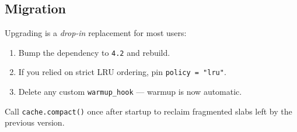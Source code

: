 \documentclass[
]{article}
\providecommand{\tightlist}{%
  \setlength{\itemsep}{0pt}\setlength{\parskip}{0pt}}
\begin{document}
\subsection{Migration}\label{migration}

Upgrading is a \emph{drop-in} replacement for most users:

\begin{enumerate}
\def\labelenumi{\arabic{enumi}.}
\tightlist
\item
  Bump the dependency to \texttt{4.2} and rebuild.
\item
  If you relied on strict LRU ordering, pin \texttt{policy\ =\ "lru"}.
\item
  Delete any custom \texttt{warmup\_hook} --- warmup is now automatic.
\end{enumerate}

Call \texttt{cache.compact()} once after startup to reclaim fragmented
slabs left by the previous version.
\end{document}
